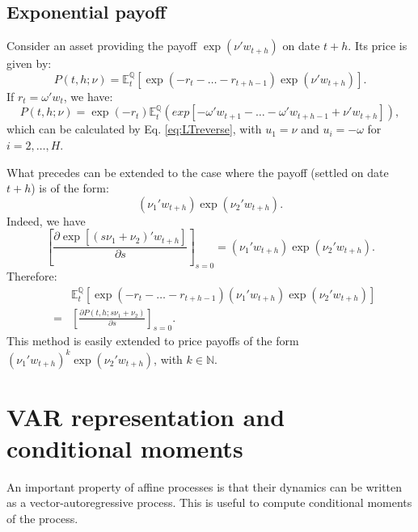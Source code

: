 \documentclass[
  12pt,
]{book}
\theoremstyle{definition}
\theoremstyle{definition}
\theoremstyle{definition}
\theoremstyle{definition}
\theoremstyle{remark}
\begin{document}
\hypertarget{ExponentialPayoff}{%
\subsection{Exponential payoff}\label{ExponentialPayoff}}

Consider an asset providing the payoff \(\exp(\nu' w_{t+h})\) on date \(t+h\). Its price is given by:
\[
P(t,h;\nu) = \mathbb{E}^{\mathbb{Q}}_t[\exp(-r_{t}-\dots-r_{t+h-1}) \exp(\nu' w_{t+h})].
\]
If \(r_t = \omega'w_t\), we have:
\[
P(t,h;\nu) = \exp(-r_{t})\mathbb{E}^{\mathbb{Q}}_t \left(exp[-\omega' w_{t+1}-\dots-\omega' w_{t+h-1}+ \nu' w_{t+h}]\right),
\]
which can be calculated by Eq. \eqref{eq:LTreverse}, with \(u_1 = \nu\) and \(u_i = -\omega\) for \(i = 2,\dots,H\).

What precedes can be extended to the case where the payoff (settled on date \(t+h\)) is of the form:
\[
(\nu_1'w_{t+h}) \exp(\nu_2' w_{t+h}).
\]
Indeed, we have
\[
\left[\frac{\partial \exp[(s \nu_1+ \nu_2)'w_{t+h}]}{\partial s}\right]_{s=0} = (\nu_1'w_{t+h}) \exp(\nu_2' w_{t+h}).
\]
Therefore:
\begin{eqnarray}
&&\mathbb{E}_t^{\mathbb{Q}}[\exp(-r_t - \dots - r_{t+h-1})(\nu_1'w_{t+h}) \exp(\nu_2' w_{t+h})] \nonumber\\
&=& \left[
\frac{\partial P(t,h;s \nu_1 + \nu_2)}{\partial s}
\right]_{s=0}.\label{eq:Affineexppayoff}
\end{eqnarray}
This method is easily extended to price payoffs of the form \((\nu_1'w_{t+h})^k \exp(\nu_2' w_{t+h})\), with \(k \in \mathbb{N}\).

\hypertarget{var-representation-and-conditional-moments}{%
\section{VAR representation and conditional moments}\label{var-representation-and-conditional-moments}}

An important property of affine processes is that their dynamics can be written as a vector-autoregressive process. This is useful to compute conditional moments of the process.
\end{document}
